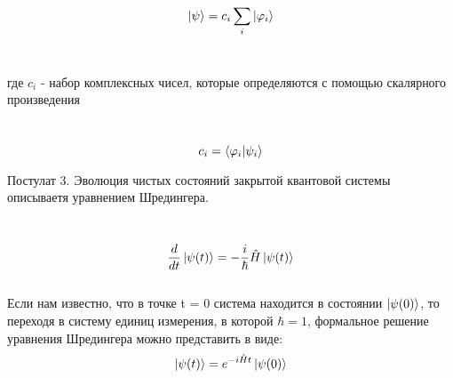 \documentclass[a4paper, 10pt]{article}
\begin{document}
        \begin{equation}
            \ket{\psi}= c_i \sum_i \ket{\varphi_i}
        \end{equation}
        \\ 
        \begin{itshape}
            где $c_i$ - набор комплексных чисел, которые определяются с помощью скалярного произведения
        \end{itshape}
        \\

        \begin{equation}
            c_i = \bra{\varphi_i} \ket{\psi_i}
        \end{equation}

        
        \begin{itshape}
            Постулат 3. Эволюция чистых состояний закрытой квантовой системы описываетя уравнением Шредингера.
        \end{itshape}
        \\

        \begin{equation}
            \frac{d}{dt} \ket{\psi(t)} = -\frac{i}{ \hbar} \hat{H} \ket{\psi(t)}
        \end{equation}
        \\

        Если нам известно, что в точке t = 0 система находится в состоянии $\ket{\psi(0)}$, то переходя в систему единиц измерения, в которой $\hbar = 1$, формальное решение уравнения Шредингера можно представить в виде:
        \\
        \begin{equation}
            \ket{\psi(t)} = e^{-i\hat{H}t} \ket{\psi(0)}
        \end{equation}
\end{document}
